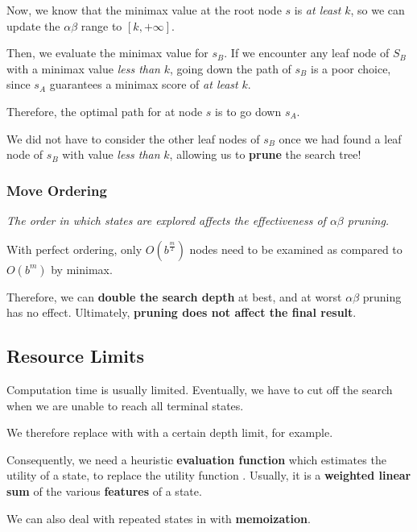             Now, we know that the minimax value at the root node $s$ is \emph{at least} $k$, so we can update the $\alpha$\textendash$\beta$ range to $[k, +\infty]$.

            Then, we evaluate the minimax value for $s_B$. If we encounter any leaf node of $S_B$ with a minimax value \emph{less than} $k$, going down the path of $s_B$ is a poor choice, since $s_A$ guarantees a minimax score of \emph{at least} $k$.

            Therefore, the optimal path for  at node $s$ is to go down $s_A$.

            We did not have to consider the other leaf nodes of $s_B$ once we had found a leaf node of $s_B$ with value \emph{less than} $k$, allowing us to \textbf{prune} the search tree!

        \subsubsection{Move Ordering}
            \emph{The order in which states are explored affects the effectiveness of $\alpha$\textendash$\beta$ pruning.}

            With perfect ordering, only $O(b^{\frac{m}{2}})$ nodes need to be examined as compared to $O(b^m)$ by minimax.

            Therefore, we can \textbf{double the search depth} at best, and at worst $\alpha$\textendash$\beta$ pruning has no effect. Ultimately, \textbf{pruning does not affect the final result}.

    \subsection{Resource Limits}
        Computation time is usually limited. Eventually, we have to cut off the search when we are unable to reach all terminal states.

        We therefore replace  with  with a certain depth limit, for example.

        Consequently, we need a heuristic \textbf{evaluation function}  which estimates the utility of a state, to replace the utility function . Usually, it is a \textbf{weighted linear sum} of the various \textbf{features} of a state.

        We can also deal with repeated states in  with \textbf{memoization}.
